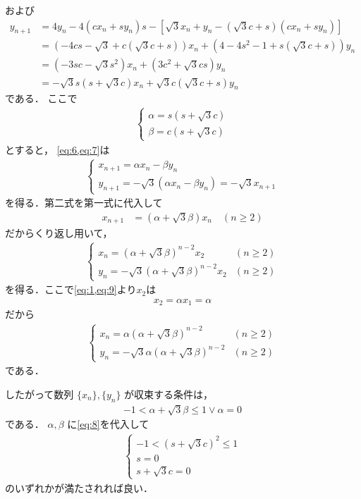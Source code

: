 \documentclass[../../main.tex]{subfiles}
\begin{document}
および
\begin{align}
  y_{n+1}
  &= 4y_{n} - 4(cx_n+sy_n)s - \left[\sqrt{3}x_n+y_n-(\sqrt{3}c+s)(cx_n+sy_n)\right] \\
  &= (-4cs-\sqrt{3}+c(\sqrt{3}c+s))x_n
  + (4-4s^2-1 +s(\sqrt{3}c+s))y_n \\
  &= (-3sc-\sqrt{3}s^2)x_n + (3c^2+\sqrt{3}cs)y_n \\
  &= -\sqrt{3}s(s+\sqrt{3}c)x_n + \sqrt{3}c(\sqrt{3}c+s)y_n \label{eq:7}
\end{align}
である．
ここで
\begin{align}
  \begin{cases}
    \alpha = s(s + \sqrt{3}c) \\
    \beta = c(s + \sqrt{3}c)
  \end{cases} \label{eq:8}
\end{align}
とすると，
\cref{eq:6,eq:7}は
\begin{align}
  \begin{cases}
    x_{n+1} = \alpha x_n - \beta y_n \\
    y_{n+1} = -\sqrt{3} (\alpha x_n - \beta y_n) = -\sqrt{3}x_{n+1}
  \end{cases} \label{eq:9}
\end{align}
を得る．第二式を第一式に代入して
\begin{align}
  x_{n+1} &= (\alpha + \sqrt{3}\beta) x_n \quad (n \ge 2)
\end{align}
だからくり返し用いて，
\begin{align}
  \begin{cases}
    x_n = (\alpha + \sqrt{3}\beta)^{n-2} x_2 & (n \ge 2) \\
    y_n = -\sqrt{3} (\alpha + \sqrt{3}\beta)^{n-2} x_2 & (n \ge 2)
  \end{cases}
\end{align}
を得る．ここで\cref{eq:1,eq:9}より$x_2$は
\begin{align}
  x_2 = \alpha x_1 = \alpha
\end{align}
だから
\begin{align}
  \begin{cases}
    x_n = \alpha (\alpha + \sqrt{3}\beta)^{n-2} & (n \ge 2)\\
    y_n = -\sqrt{3}\alpha (\alpha + \sqrt{3}\beta)^{n-2} & (n \ge 2)
  \end{cases} \label{eq:10}
\end{align}
である．

したがって数列 $\{x_n\}, \{y_n\}$ が収束する条件は，
\begin{align}
  -1 < \alpha + \sqrt{3}\beta \le 1 \lor \alpha = 0
\end{align}
である． $\alpha, \beta$ に\cref{eq:8}を代入して
\begin{align}
  \begin{cases}
    -1 < (s + \sqrt{3}c)^2 \le 1 \\
    s = 0 \\
    s + \sqrt{3}c = 0
  \end{cases}
\end{align}
のいずれかが満たされれば良い．
\end{document}
